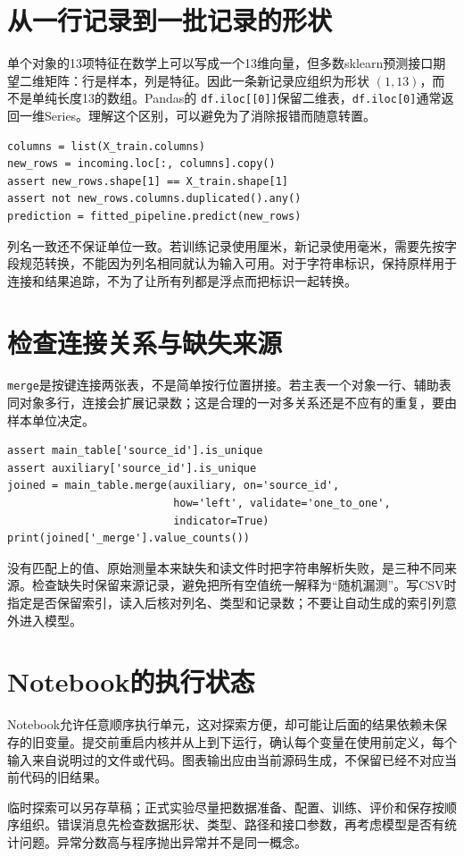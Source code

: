 
\section{从一行记录到一批记录的形状}
单个对象的13项特征在数学上可以写成一个13维向量，但多数sklearn预测接口期望二维矩阵：行是样本，列是特征。因此一条新记录应组织为形状 $(1,13)$，而不是单纯长度13的数组。Pandas的 \texttt{df.iloc[[0]]}保留二维表，\texttt{df.iloc[0]}通常返回一维Series。理解这个区别，可以避免为了消除报错而随意转置。

\begin{lstlisting}[caption={保持特征顺序和二维样本结构}]
columns = list(X_train.columns)
new_rows = incoming.loc[:, columns].copy()
assert new_rows.shape[1] == X_train.shape[1]
assert not new_rows.columns.duplicated().any()
prediction = fitted_pipeline.predict(new_rows)
\end{lstlisting}

列名一致还不保证单位一致。若训练记录使用厘米，新记录使用毫米，需要先按字段规范转换，不能因为列名相同就认为输入可用。对于字符串标识，保持原样用于连接和结果追踪，不为了让所有列都是浮点而把标识一起转换。

\section{检查连接关系与缺失来源}
\texttt{merge}是按键连接两张表，不是简单按行位置拼接。若主表一个对象一行、辅助表同对象多行，连接会扩展记录数；这是合理的一对多关系还是不应有的重复，要由样本单位决定。
\begin{lstlisting}[caption={给一对一连接设置显式约束}]
assert main_table['source_id'].is_unique
assert auxiliary['source_id'].is_unique
joined = main_table.merge(auxiliary, on='source_id',
                          how='left', validate='one_to_one',
                          indicator=True)
print(joined['_merge'].value_counts())
\end{lstlisting}

没有匹配上的值、原始测量本来缺失和读文件时把字符串解析失败，是三种不同来源。检查缺失时保留来源记录，避免把所有空值统一解释为“随机漏测”。写CSV时指定是否保留索引，读入后核对列名、类型和记录数；不要让自动生成的索引列意外进入模型。

\section{Notebook的执行状态}
Notebook允许任意顺序执行单元，这对探索方便，却可能让后面的结果依赖未保存的旧变量。提交前重启内核并从上到下运行，确认每个变量在使用前定义，每个输入来自说明过的文件或代码。图表输出应由当前源码生成，不保留已经不对应当前代码的旧结果。

临时探索可以另存草稿；正式实验尽量把数据准备、配置、训练、评价和保存按顺序组织。错误消息先检查数据形状、类型、路径和接口参数，再考虑模型是否有统计问题。异常分数高与程序抛出异常并不是同一概念。
